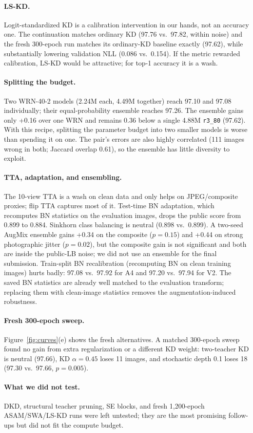 \paragraph{LS-KD.}
Logit-standardized KD is a calibration intervention in our hands, not an accuracy
one. The continuation matches ordinary KD (97.76 vs.\ 97.82, within noise) and the
fresh 300-epoch run matches its ordinary-KD baseline exactly (97.62), while
substantially lowering validation NLL (0.086 vs.\ 0.154). If the metric rewarded
calibration, LS-KD would be attractive; for top-1 accuracy it is a wash.

\paragraph{Splitting the budget.}
Two WRN-40-2 models (2.24M each, 4.49M together) reach 97.10 and 97.08
individually; their equal-probability ensemble reaches 97.26. The ensemble gains
only +0.16 over one WRN and remains 0.36 below a single 4.88M \texttt{r3\_80}
(97.62). With this recipe, splitting the parameter budget into two smaller models
is worse than spending it on one. The pair's errors are also highly correlated
(111 images wrong in both; Jaccard overlap 0.61), so the ensemble has little
diversity to exploit.

\paragraph{TTA, adaptation, and ensembling.}
The 10-view TTA is a wash on clean data and only helps on JPEG/composite proxies;
flip TTA captures most of it. Test-time BN adaptation, which recomputes BN
statistics on the evaluation images, drops the public score from 0.899 to 0.884.
Sinkhorn class balancing is neutral (0.898 vs.\ 0.899). A two-seed AugMix
ensemble gains +0.34 on the composite ($p=0.15$) and +0.44 on strong photographic
jitter ($p=0.02$), but the composite gain is not significant and both are inside
the public-LB noise; we did not use an ensemble for the final submission.
Train-split BN recalibration (recomputing BN on clean training images) hurts
badly: 97.08 vs.\ 97.92 for A4 and 97.20 vs.\ 97.94 for V2. The saved BN
statistics are already well matched to the evaluation transform; replacing them
with clean-image statistics removes the augmentation-induced robustness.

\paragraph{Fresh 300-epoch sweep.}
Figure~\ref{fig:curves}(e) shows the fresh alternatives. A matched
300-epoch sweep found no gain from extra regularization or a different KD weight:
two-teacher KD is neutral (97.66), KD $\alpha=0.45$ loses 11 images, and
stochastic depth 0.1 loses 18 (97.30 vs.\ 97.66, $p=0.005$).



\paragraph{What we did not test.}
DKD, structural teacher pruning, SE blocks, and fresh 1,200-epoch ASAM/SWA/LS-KD
runs were left untested; they are the most promising follow-ups but did not fit
the compute budget.
